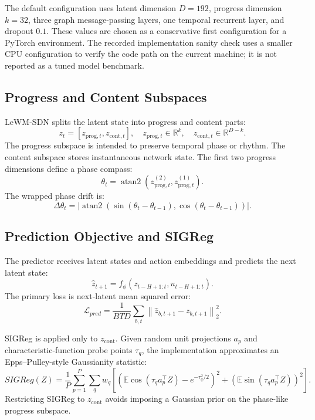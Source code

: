 \documentclass[runningheads]{llncs}
\begin{document}
The default configuration uses latent dimension $D=192$, progress dimension
$k=32$, three graph message-passing layers, one temporal recurrent layer, and
dropout $0.1$. These values are chosen as a conservative first configuration
for a PyTorch environment. The recorded implementation sanity check uses a
smaller CPU configuration to verify the code path on the current machine; it is
not reported as a tuned model benchmark.

\subsection{Progress and Content Subspaces}

LeWM-SDN splits the latent state into progress and content parts:
\begin{equation}
z_t = [z_{\mathrm{prog},t}, z_{\mathrm{cont},t}],
\quad
z_{\mathrm{prog},t}\in\mathbb{R}^{k},
\quad
z_{\mathrm{cont},t}\in\mathbb{R}^{D-k}.
\end{equation}
The progress subspace is intended to preserve temporal phase or rhythm. The
content subspace stores instantaneous network state. The first two progress
dimensions define a phase compass:
\begin{equation}
\theta_t =
\operatorname{atan2}(z_{\mathrm{prog},t}^{(2)},
z_{\mathrm{prog},t}^{(1)}).
\end{equation}
The wrapped phase drift is:
\begin{equation}
\Delta\theta_t =
\left|\operatorname{atan2}(\sin(\theta_t-\theta_{t-1}),
\cos(\theta_t-\theta_{t-1}))\right|.
\end{equation}

\subsection{Prediction Objective and SIGReg}

The predictor receives latent states and action embeddings and predicts the
next latent state:
\begin{equation}
\hat{z}_{t+1} = f_\phi(z_{t-H+1:t}, u_{t-H+1:t}).
\end{equation}
The primary loss is next-latent mean squared error:
\begin{equation}
\mathcal{L}_{pred} =
\frac{1}{B T D}
\sum_{b,t}\left\|\hat{z}_{b,t+1}-z_{b,t+1}\right\|_2^2.
\end{equation}

SIGReg is applied only to $z_{\mathrm{cont}}$. Given random unit projections
$a_p$ and characteristic-function probe points $\tau_q$, the implementation
approximates an Epps--Pulley-style Gaussianity statistic:
\begin{equation}
SIGReg(Z) =
\frac{1}{P}\sum_{p=1}^{P}\sum_q w_q
\left[
\left(\mathbb{E}\cos(\tau_q a_p^\top Z) - e^{-\tau_q^2/2}\right)^2
+ \left(\mathbb{E}\sin(\tau_q a_p^\top Z)\right)^2
\right].
\end{equation}
Restricting SIGReg to $z_{\mathrm{cont}}$ avoids imposing a Gaussian prior on
the phase-like progress subspace.
\end{document}
